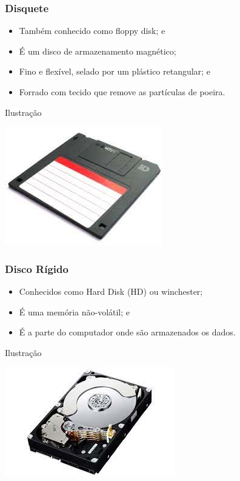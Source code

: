 \documentclass[aspectratio=169]{beamer} %
\begin{document}
\begin{frame}
	\frametitle{Disquete}
		
	\begin{itemize}
		\item Também conhecido como floppy disk; e
		\item É um disco de armazenamento magnético;
		\item Fino e flexível, selado por um plástico retangular; e 
		\item Forrado com tecido que remove as partículas de poeira.
	\end{itemize}\vfill
	
	\begin{exampleblock}{Ilustra\c cão}
		\begin{center}
			\includegraphics[scale=0.4]{img/disquete}
		\end{center}
	\end{exampleblock}
\end{frame}

\begin{frame}
	\frametitle{Disco Rígido}
		
	\begin{itemize}
		\item Conhecidos como Hard Disk (HD) ou winchester;
		\item É uma memória não-volátil; e
		\item É a parte do computador onde são armazenados os dados.
	\end{itemize}\vfill
	
	\begin{exampleblock}{Ilustra\c cão}
		\begin{center}
			\includegraphics[scale=0.4]{img/hd}
		\end{center}		
	\end{exampleblock}
\end{frame}
\end{document}
